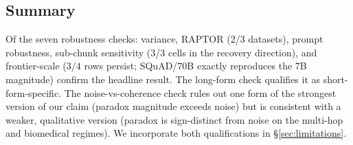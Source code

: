 \subsection{Summary}
\label{sec:rob:summary}

Of the seven robustness checks: variance, RAPTOR (2/3 datasets), prompt
robustness, sub-chunk sensitivity (3/3 cells in the recovery
direction), and frontier-scale ($3/4$ rows persist; SQuAD/$70$B
exactly reproduces the $7$B magnitude) confirm the headline result.
The long-form check qualifies it as short-form-specific. The
noise-vs-coherence check rules out one form of the strongest version
of our claim (paradox magnitude exceeds noise) but is consistent with
a weaker, qualitative version (paradox is sign-distinct from noise on
the multi-hop and biomedical regimes). We incorporate both
qualifications in \S\ref{sec:limitations}.
